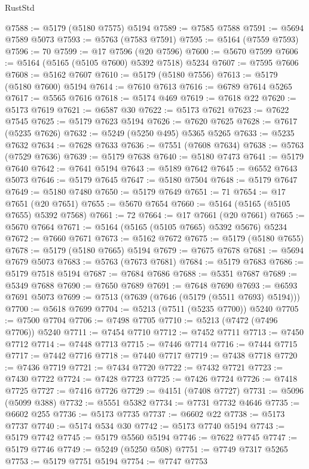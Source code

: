\begin{lexlean}{RustStd}
\begin{coremodule}
@7588 := @5179 (@5180 @7575) @5194
@7589 := @7585 @7588
@7591 := @5694 @7589 @5073
@7593 := @5763 (@7583 @7591)
@7595 := @5164 (@7559 @7593)
@7596 := 70
@7599 := @17 @7596 (@20 @7596)
@7600 := @5670 @7599
@7606 := @5164 (@5165 (@5105 @7600) @5392 @7518) @5234
@7607 := @7595 @7606
@7608 := @5162 @7607
@7610 := @5179 (@5180 @7556)
@7613 := @5179 (@5180 @7600) @5194
@7614 := @7610 @7613
@7616 := @6789 @7614 @5265
@7617 := @5565 @7616
@7618 := @5174 @469
@7619 := @7618 @22
@7620 := @5173 @7619
@7621 := @6587 @30
@7622 := @5173 @7621
@7623 := @7622 @7545
@7625 := @5179 @7623 @5194
@7626 := @7620 @7625
@7628 := @7617 (@5235 @7626)
@7632 := @5249 (@5250 @495) @5365 @5265
@7633 := @5235 @7632
@7634 := @7628 @7633
@7636 := @7551 (@7608 @7634)
@7638 := @5763 (@7529 @7636)
@7639 := @5179 @7638
@7640 := @5180 @7473
@7641 := @5179 @7640
@7642 := @7641 @5194
@7643 := @5189 @7642
@7645 := @6552 @7643 @5073
@7646 := @5179 @7645
@7647 := @5180 @7504
@7648 := @5179 @7647
@7649 := @5180 @7480
@7650 := @5179 @7649
@7651 := 71
@7654 := @17 @7651 (@20 @7651)
@7655 := @5670 @7654
@7660 := @5164 (@5165 (@5105 @7655) @5392 @7568)
@7661 := 72
@7664 := @17 @7661 (@20 @7661)
@7665 := @5670 @7664
@7671 := @5164 (@5165 (@5105 @7665) @5392 @5676) @5234
@7672 := @7660 @7671
@7673 := @5162 @7672
@7675 := @5179 (@5180 @7655)
@7678 := @5179 (@5180 @7665) @5194
@7679 := @7675 @7678
@7681 := @5694 @7679 @5073
@7683 := @5763 (@7673 @7681)
@7684 := @5179 @7683
@7686 := @5179 @7518 @5194
@7687 := @7684 @7686
@7688 := @5351 @7687
@7689 := @5349 @7688
@7690 := @7650 @7689
@7691 := @7648 @7690
@7693 := @6593 @7691 @5073
@7699 := @7513 (@7639 (@7646 (@5179 (@5511 @7693) @5194)))
@7700 := @5618 @7699
@7704 := @5213 (@7511 (@5235 @7700)) @5240
@7705 := @7500 @7704
@7706 := @7498 @7705
@7710 := @5213 (@7472 (@7496 @7706)) @5240
@7711 := @7454 @7710
@7712 := @7452 @7711
@7713 := @7450 @7712
@7714 := @7448 @7713
@7715 := @7446 @7714
@7716 := @7444 @7715
@7717 := @7442 @7716
@7718 := @7440 @7717
@7719 := @7438 @7718
@7720 := @7436 @7719
@7721 := @7434 @7720
@7722 := @7432 @7721
@7723 := @7430 @7722
@7724 := @7428 @7723
@7725 := @7426 @7724
@7726 := @7418 @7725
@7727 := @7416 @7726
@7729 := @4151 (@7408 @7727)
@7731 := @5096 (@5099 @388)
@7732 := @5551 @5382
@7734 := @7731 @7732 @4646
@7735 := @6602 @255
@7736 := @5173 @7735
@7737 := @6602 @22
@7738 := @5173 @7737
@7740 := @5174 @534 @30
@7742 := @5173 @7740 @5194
@7743 := @5179 @7742
@7745 := @5179 @5560 @5194
@7746 := @7622 @7745
@7747 := @5179 @7746
@7749 := @5249 (@5250 @508)
@7751 := @7749 @7317 @5265
@7753 := @5179 @7751 @5194
@7754 := @7747 @7753

\end{coremodule}
\end{lexlean}
